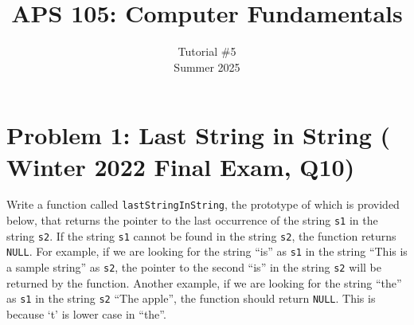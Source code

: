 \documentclass[12pt]{article}
\begin{document}
 
 
\title{APS 105: Computer Fundamentals}
\date{}
\author{Tutorial \#5\\ 
Summer 2025}

\maketitle

\section*{Problem 1: Last String in String ( Winter 2022 Final Exam, Q10)}

Write a function called \texttt{lastStringInString}, the prototype of which is provided below, that returns the pointer to the last occurrence of the string \texttt{s1} in the string \texttt{s2}. If the string \texttt{s1} cannot be found in the string \texttt{s2}, the function returns \texttt{NULL}. For example, if we are looking for the string ``is'' as \texttt{s1} in the string ``This is a sample string'' as \texttt{s2}, the pointer to the second ``is'' in the string \texttt{s2} will be returned by the function. Another example, if we are looking for the string ``the'' as \texttt{s1} in the string \texttt{s2} ``The apple'', the function should return \texttt{NULL}. This is because `t' is lower case in ``the''.
\end{document}

